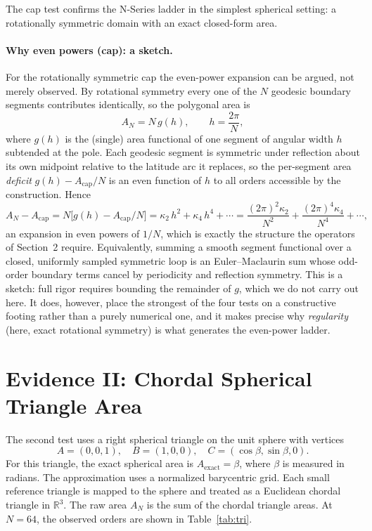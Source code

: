 \documentclass[11pt]{article}
\begin{document}
The cap test confirms the N-Series ladder in the simplest spherical setting: a
rotationally symmetric domain with an exact closed-form area.

\paragraph{Why even powers (cap): a sketch.}
For the rotationally symmetric cap the even-power expansion can be argued, not merely
observed. By rotational symmetry every one of the $N$ geodesic boundary segments
contributes identically, so the polygonal area is
\[
A_N = N\,g(h), \qquad h = \frac{2\pi}{N},
\]
where $g(h)$ is the (single) area functional of one segment of angular width $h$ subtended
at the pole. Each geodesic segment is symmetric under reflection about its own midpoint
relative to the latitude arc it replaces, so the per-segment area \emph{deficit}
$g(h) - A_{\mathrm{cap}}/N$ is an even function of $h$ to all orders accessible by the
construction. Hence
\[
A_N - A_{\mathrm{cap}} = N\bigl[g(h) - A_{\mathrm{cap}}/N\bigr]
   = \kappa_2\,h^2 + \kappa_4\,h^4 + \cdots
   = \frac{(2\pi)^2\kappa_2}{N^2} + \frac{(2\pi)^4\kappa_4}{N^4} + \cdots,
\]
an expansion in even powers of $1/N$, which is exactly the structure the operators of
Section~2 require. Equivalently, summing a smooth segment functional over a closed,
uniformly sampled symmetric loop is an Euler--Maclaurin sum whose odd-order boundary terms
cancel by periodicity and reflection symmetry. This is a sketch: full rigor requires
bounding the remainder of $g$, which we do not carry out here. It does, however, place the
strongest of the four tests on a constructive footing rather than a purely numerical one,
and it makes precise why \emph{regularity} (here, exact rotational symmetry) is what
generates the even-power ladder.

\section{Evidence II: Chordal Spherical Triangle Area}
The second test uses a right spherical triangle on the unit sphere with vertices
\[
A=(0,0,1),\quad B=(1,0,0),\quad C=(\cos\beta,\sin\beta,0).
\]
For this triangle, the exact spherical area is $A_{\mathrm{exact}} = \beta$, where $\beta$
is measured in radians. The approximation uses a normalized barycentric grid. Each small
reference triangle is mapped to the sphere and treated as a Euclidean chordal triangle in
$\mathbb{R}^3$. The raw area $A_N$ is the sum of the chordal triangle areas. At $N=64$, the
observed orders are shown in Table~\ref{tab:tri}.
\end{document}
